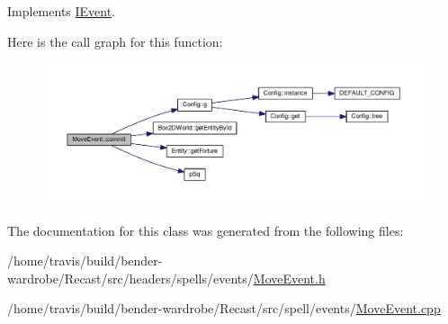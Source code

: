 Implements \hyperlink{class_i_event_a5422b83a412e52b68c7885b53a421e0e}{I\-Event}.



Here is the call graph for this function\-:
\nopagebreak
\begin{figure}[H]
\begin{center}
\leavevmode
\includegraphics[width=350pt]{class_move_event_a409faa8726fad01a66fe86d61369fcaf_cgraph}
\end{center}
\end{figure}




The documentation for this class was generated from the following files\-:\begin{DoxyCompactItemize}
\item 
/home/travis/build/bender-\/wardrobe/\-Recast/src/headers/spells/events/\hyperlink{_move_event_8h}{Move\-Event.\-h}\item 
/home/travis/build/bender-\/wardrobe/\-Recast/src/spell/events/\hyperlink{_move_event_8cpp}{Move\-Event.\-cpp}\end{DoxyCompactItemize}
